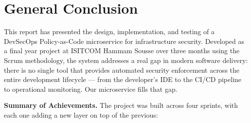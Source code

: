 
\chapter*{General Conclusion}


This report has presented the design, implementation, and testing of a DevSecOps Policy-as-Code microservice for infrastructure security. Developed as a final year project at ISITCOM Hammam Sousse over three months using the Scrum methodology, the system addresses a real gap in modern software delivery: there is no single tool that provides automated security enforcement across the entire development lifecycle --- from the developer's IDE to the CI/CD pipeline to operational monitoring. Our microservice fills that gap.


\vspace{0.3cm}
\noindent\textbf{Summary of Achievements.}\quad
The project was built across four sprints, with each one adding a new layer on top of the previous:

